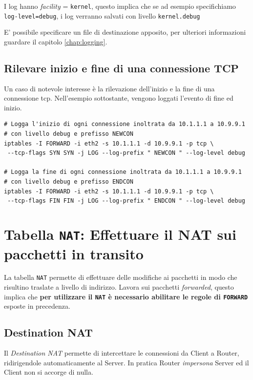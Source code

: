 \documentclass[a4paper]{report}
\newenvironment{info}{\begin{tcolorbox}[fonttitle=\sffamily\bfseries\large,title=Info,colframe=blue!75!white]}{\end{tcolorbox}}
\newenvironment{code}{\begin{tcolorbox}[size=small]}{\end{tcolorbox}}
\begin{document}
\begin{info}
	I log hanno \textit{facility} = \texttt{kernel}, questo implica che se ad esempio specifichiamo \texttt{log-level=debug}, i log verranno salvati con livello \texttt{kernel.debug}
	
	E' possibile specificare un file di destinazione apposito, per ulteriori informazioni guardare il capitolo \ref{chap:logging}.
\end{info}

\subsection{Rilevare inizio e fine di una connessione TCP}

Un caso di notevole interesse è la rilevazione dell'inizio e la fine di una connessione tcp. Nell'esempio sottostante, vengono loggati l'evento di fine ed inizio.

\begin{code}
\begin{lstlisting}
# Logga l'inizio di ogni connessione inoltrata da 10.1.1.1 a 10.9.9.1
# con livello debug e prefisso NEWCON
iptables -I FORWARD -i eth2 -s 10.1.1.1 -d 10.9.9.1 -p tcp \
 --tcp-flags SYN SYN -j LOG --log-prefix " NEWCON " --log-level debug
 
# Logga la fine di ogni connessione inoltrata da 10.1.1.1 a 10.9.9.1
# con livello debug e prefisso ENDCON
iptables -I FORWARD -i eth2 -s 10.1.1.1 -d 10.9.9.1 -p tcp \
 --tcp-flags FIN FIN -j LOG --log-prefix " ENDCON " --log-level debug
\end{lstlisting}
\end{code}

\section{Tabella \texttt{NAT}: Effettuare il NAT sui pacchetti in transito}

La tabella \texttt{NAT} permette di effettuare delle modifiche ai pacchetti in modo che risultino traslate a livello di indirizzo.
Lavora sui pacchetti \textit{forwarded}, questo implica che \textbf{per utilizzare il \texttt{NAT} è necessario abilitare le regole di \texttt{FORWARD}} esposte in precedenza.

\subsection{Destination NAT}

Il \textit{Destination NAT} permette di intercettare le connessioni da Client a Router, ridirigendole automaticamente al Server. In pratica Router \textit{impersona} Server ed il Client non si accorge di nulla.
\end{document}
